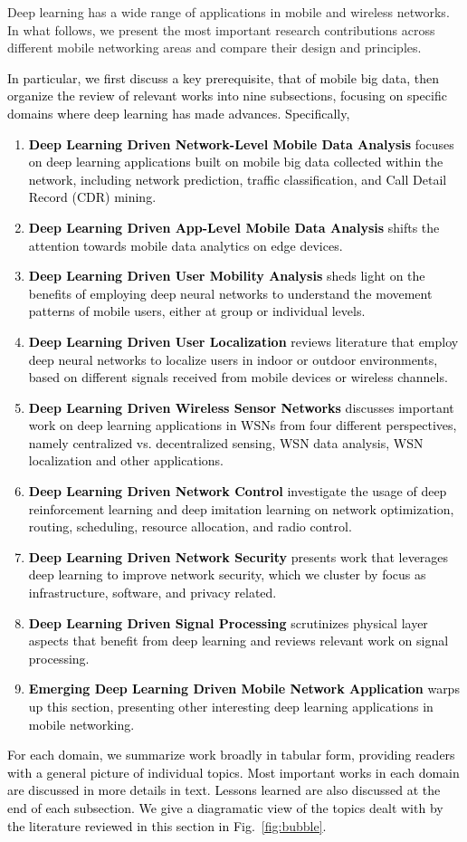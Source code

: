 \documentclass[journal,comsoc,letter]{IEEEtran}
\newcommand{\edit}[1]{\textcolor{black}{#1}}
\newcommand{\rev}[1]{\textcolor{black}{#1}}
\begin{document}
Deep learning has a wide range of applications in mobile and wireless networks. In what follows, we present the most important research contributions across different mobile networking areas and compare their design and principles. \edit{In particular, we first discuss a key prerequisite, that of mobile big data, then organize the review of relevant works into nine subsections, focusing on specific domains where deep learning has made advances. Specifically, 
\begin{enumerate}
\item \textbf{Deep Learning Driven Network-Level Mobile Data Analysis} focuses on deep learning applications built on mobile big data collected within the network, including network prediction, traffic classification, and Call Detail Record (CDR) mining.
\item \textbf{Deep Learning Driven App-Level Mobile Data Analysis} shifts the attention towards mobile data analytics on edge devices.
\item \rev{\textbf{Deep Learning Driven User Mobility Analysis} sheds light on the benefits of employing deep neural networks to understand the movement patterns of mobile users, either at group or individual levels.}
\item \rev{\textbf{Deep Learning Driven User Localization} reviews literature that employ deep neural networks to localize users in indoor or outdoor environments, based on different signals received from mobile devices or wireless channels.}
\item \textbf{Deep Learning Driven Wireless Sensor Networks} discusses important work on deep learning applications in WSNs \rev{from four different perspectives, namely centralized vs. decentralized sensing, WSN data analysis, WSN localization and other applications. }
\item \textbf{Deep Learning Driven Network Control} investigate the usage of deep reinforcement learning and deep imitation learning on network optimization, routing, scheduling, resource allocation, and radio control.
\item \textbf{Deep Learning Driven Network Security} presents work that leverages deep learning to improve  network security, which we cluster by focus as infrastructure, software, and privacy related.
\item \textbf{Deep Learning Driven Signal Processing} scrutinizes physical layer aspects that benefit from deep learning and reviews relevant work on signal processing.
\item \textbf{Emerging Deep Learning Driven Mobile Network Application} warps up this section, presenting other interesting deep learning applications in mobile networking.
\end{enumerate} 
For each domain, we summarize work broadly in tabular form, providing readers with a general picture of individual topics. Most important works in each domain are discussed in more details in text. Lessons learned are also discussed at the end of each subsection. We give a diagramatic view of the topics dealt with by the literature reviewed in this section in Fig.~\ref{fig:bubble}.
}
\end{document}
